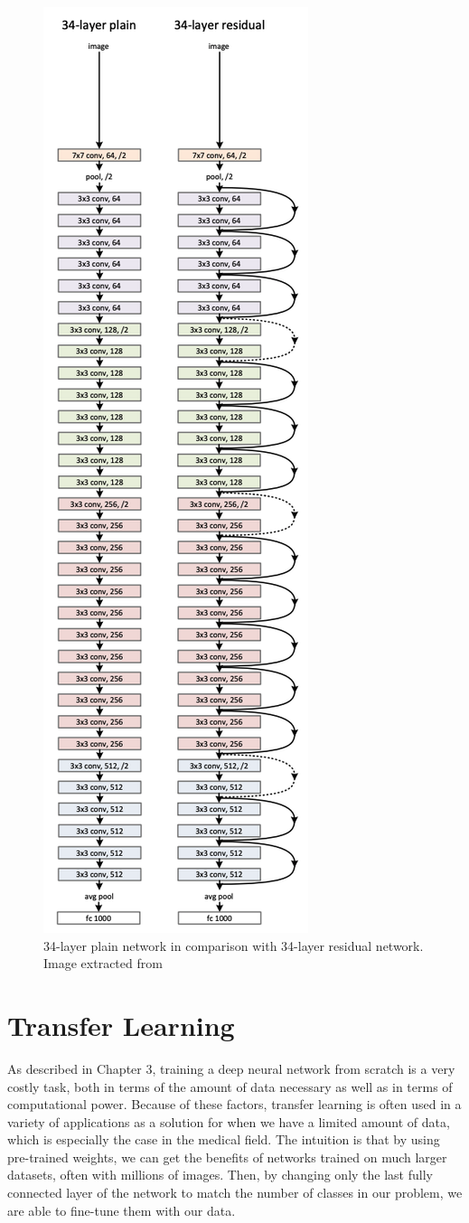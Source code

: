 \begin{figure}[h!tp]
    \centering
    \includegraphics[width=.4\textwidth]{imgs/chap5_resnet.png}
    \caption[34-layer plain network in comparison with 34-layer residual network.]{34-layer plain network in comparison with 34-layer residual network. Image extracted from \cite{ParkhiVZ15}}
    \label{fig:resnet}
\end{figure}

\section{Transfer Learning}

As described in Chapter 3, training a deep neural network from scratch is a very costly task, both in terms of the amount of data necessary as well as in terms of computational power. Because of these factors, transfer learning is often used in a variety of applications as a solution for when we have a limited amount of data, which is especially the case in the medical field. The intuition is that by using pre-trained weights, we can get the benefits of networks trained on much larger datasets, often with millions of images. Then, by changing only the last fully connected layer of the network to match the number of classes in our problem, we are able to fine-tune them with our data.

